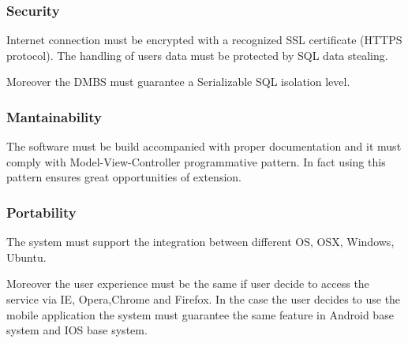 \subsubsection{Security}
Internet connection must be encrypted with a recognized SSL certificate (HTTPS protocol). The handling of users data must be protected by SQL data stealing. \par Moreover the DMBS must guarantee a Serializable SQL isolation level.
\subsubsection{Mantainability}
The software must be build accompanied with proper documentation and it must comply with Model-View-Controller programmative pattern. In fact using this pattern ensures great opportunities of extension.
\subsubsection{Portability}
The system must support the integration between different OS, OSX, Windows, Ubuntu. \par Moreover the user experience must be the same if user decide to access the service via IE, Opera,Chrome and Firefox. In the case the user decides to use the mobile application the system must guarantee the same feature in Android base system and IOS base system.